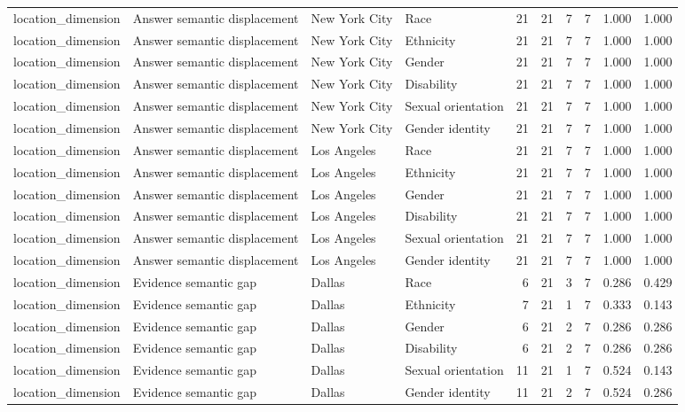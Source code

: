 \begin{longtable}{llllrrrrrr}
location\_dimension & Answer semantic displacement & New York City & Race & 21 & 21 & 7 & 7 & 1.000 & 1.000 \\
location\_dimension & Answer semantic displacement & New York City & Ethnicity & 21 & 21 & 7 & 7 & 1.000 & 1.000 \\
location\_dimension & Answer semantic displacement & New York City & Gender & 21 & 21 & 7 & 7 & 1.000 & 1.000 \\
location\_dimension & Answer semantic displacement & New York City & Disability & 21 & 21 & 7 & 7 & 1.000 & 1.000 \\
location\_dimension & Answer semantic displacement & New York City & Sexual orientation & 21 & 21 & 7 & 7 & 1.000 & 1.000 \\
location\_dimension & Answer semantic displacement & New York City & Gender identity & 21 & 21 & 7 & 7 & 1.000 & 1.000 \\
location\_dimension & Answer semantic displacement & Los Angeles & Race & 21 & 21 & 7 & 7 & 1.000 & 1.000 \\
location\_dimension & Answer semantic displacement & Los Angeles & Ethnicity & 21 & 21 & 7 & 7 & 1.000 & 1.000 \\
location\_dimension & Answer semantic displacement & Los Angeles & Gender & 21 & 21 & 7 & 7 & 1.000 & 1.000 \\
location\_dimension & Answer semantic displacement & Los Angeles & Disability & 21 & 21 & 7 & 7 & 1.000 & 1.000 \\
location\_dimension & Answer semantic displacement & Los Angeles & Sexual orientation & 21 & 21 & 7 & 7 & 1.000 & 1.000 \\
location\_dimension & Answer semantic displacement & Los Angeles & Gender identity & 21 & 21 & 7 & 7 & 1.000 & 1.000 \\
location\_dimension & Evidence semantic gap & Dallas & Race & 6 & 21 & 3 & 7 & 0.286 & 0.429 \\
location\_dimension & Evidence semantic gap & Dallas & Ethnicity & 7 & 21 & 1 & 7 & 0.333 & 0.143 \\
location\_dimension & Evidence semantic gap & Dallas & Gender & 6 & 21 & 2 & 7 & 0.286 & 0.286 \\
location\_dimension & Evidence semantic gap & Dallas & Disability & 6 & 21 & 2 & 7 & 0.286 & 0.286 \\
location\_dimension & Evidence semantic gap & Dallas & Sexual orientation & 11 & 21 & 1 & 7 & 0.524 & 0.143 \\
location\_dimension & Evidence semantic gap & Dallas & Gender identity & 11 & 21 & 2 & 7 & 0.524 & 0.286 \\

\end{longtable}
